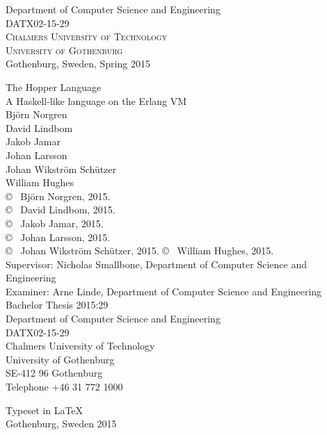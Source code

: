 \begin{center}
	Department of Computer Science and Engineering \\
	DATX02-15-29\\
	\textsc{Chalmers University of Technology} \\
	\textsc{University of Gothenburg} \\
	Gothenburg, Sweden, Spring 2015 \\
\end{center}


\newpage
\thispagestyle{plain}
\vspace*{4.5cm}
The Hopper Language\\
A Haskell-like language on the Erlang VM\\
Björn Norgren\\
David Lindbom\\
Jakob Jamar\\
Johan Larsson\\
Johan Wikström Schützer\\
William Hughes\\[0.5cm]

\copyright ~ Björn Norgren, 2015.\\
\copyright ~ David Lindbom, 2015.\\
\copyright ~ Jakob Jamar, 2015.\\
\copyright ~ Johan Larsson, 2015.\\
\copyright ~ Johan Wikström Schützer, 2015.
\copyright ~ William Hughes, 2015.\\[0.5cm]

Supervisor: Nicholas Smallbone, Department of Computer Science and Engineering\\
Examiner: Arne Linde, Department of Computer Science and Engineering\\[0.5cm]

Bachelor Thesis 2015:29\\
Department of Computer Science and Engineering\\
DATX02-15-29\\
Chalmers University of Technology\\
University of Gothenburg\\
SE-412 96 Gothenburg\\
Telephone +46 31 772 1000\\

\vfill

Typeset in \LaTeX \\
Gothenburg, Sweden 2015
